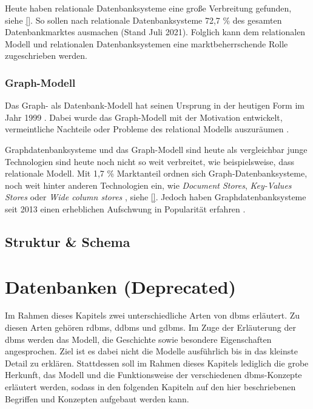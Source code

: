 Heute haben relationale Datenbanksysteme eine große Verbreitung gefunden, siehe \autoref{}. So sollen nach \cite{db_engines_ranking_july} relationale Datenbanksysteme 72,7 \% des gesamten Datenbankmarktes ausmachen (Stand Juli 2021). Folglich kann dem relationalen Modell und relationalen Datenbanksystemen eine marktbeherrschende Rolle zugeschrieben werden.


\subsubsection{Graph-Modell}
Das Graph- als Datenbank-Modell hat seinen Ursprung in der heutigen Form im Jahr 1999 \cite{gdbms}. Dabei wurde das Graph-Modell mit der Motivation entwickelt, vermeintliche Nachteile oder Probleme des relational Modells auszuräumen \cite{gdbms}.

Graphdatenbanksysteme und das Graph-Modell sind heute als vergleichbar junge Technologien sind heute noch nicht so weit verbreitet, wie beispielsweise, dass relationale Modell. Mit 1,7 \% Marktanteil ordnen sich Graph-Datenbanksysteme, noch weit hinter anderen Technologien ein, wie \textit{Document Stores}, \textit{Key-Values Stores} oder \textit{Wide column stores} \cite{db_engines_ranking_july}, siehe \autoref{}. Jedoch haben Graphdatenbanksysteme seit 2013 einen erheblichen Aufschwung in Popularität erfahren \cite{db_engines_ranking_july}. 

\subsection{Struktur \& Schema}

\section{Datenbanken (Deprecated)}
Im Rahmen dieses Kapitels zwei unterschiedliche Arten von \acl{dbms} erläutert. Zu diesen Arten gehören \acl{rdbms}, \acl{ddbms} und \acl{gdbms}. Im Zuge der Erläuterung der \acs{dbms} werden das Modell, die Geschichte sowie besondere Eigenschaften angesprochen. Ziel ist es dabei nicht die Modelle ausführlich bis in das kleinste Detail zu erklären. Stattdessen soll im Rahmen dieses Kapitels lediglich die grobe Herkunft, das Modell und die Funktionsweise der verschiedenen \acs{dbms}-Konzepte erläutert werden, sodass in den folgenden Kapiteln auf den hier beschriebenen Begriffen und Konzepten aufgebaut werden kann.   

